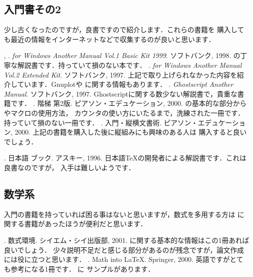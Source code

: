 \subsection{入門書その2}
少し古くなったのですが，良書ですので紹介します．これらの書籍を
購入しても最近の情報をインターネットなどで収集するのが良いと思います．
%
\begin{myreferences}
, . \newblock
{\em {\pLaTeXe} for Windows Another Manual Vol.1 Basic Kit 1999}.
ソフトバンク, 1998. 
\sanko
{\pLaTeXe}の丁寧な解説書です．持っていて損のない本です．
%
\iiiemdash. \newblock
{\em {\pLaTeXe} for Windows Another Manual Vol.2 Extended Kit}.
ソフトバンク, 1997. 
\sanko
上記で取り上げられなかった内容を紹介しています．Gnuplotや{\AmSLaTeX}
に関する情報もあります．
. \newblock
{\em Ghostscript Another Manual}.
ソフトバンク, 1997. 
\sanko
Ghostscriptに関する数少ない解説書で，貴重な書籍です．
%
.  \newblock
{\LaTeXe} 階梯 第2版. 
ピアソン・エデュケーション, 2000. 
\sanko
{\LaTeXe}の基本的な部分から{\XyMTeX}やマクロの使用方法，
カウンタの使い方にいたるまで，洗練された一冊です．
持っていて損のない一冊です．
%
\iiiemdash.  \newblock
\pLaTeXe 入門・縦横文書術. 
ピアソン・エデュケーション, 2000. 
\sanko
上記の書籍を購入した後に縦組みにも興味のある人は
購入すると良いでしょう．
%

 .
日本語 {\LaTeXe} ブック. \newblock
アスキー, 1996. 
\sanko
日本語{\TeX}の開発者による解説書です．これは良書なのですが，
入手は難しいようです．
\end{myreferences}


\subsection{数学系}
入門の書籍を持っていれば困る事はないと思いますが，数式を多用する方は
{\AmSLaTeX}に関する書籍があったほうが便利だと思います．
%
\begin{myreferences}
  . \newblock
  {\LaTeXe} 数式環境. 
  シイエム・シイ出版部, 2001. 
  \sanko
  {\AmSLaTeX}に関する基本的な情報はこの1冊あれば良いでしょう．
  少々説明不足だと感じる部分があるのが残念ですが，論文作成には役に立つと思います．
%
%
.  \newblock
Math into {\LaTeX}. 
Springer, 2000. 
\sanko
英語ですがとても参考になる1冊です． に
サンプルがあります．
\end{myreferences}

